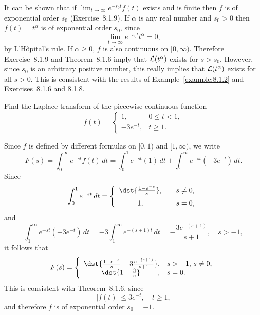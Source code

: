\setcounter{example}{8}
\begin{example}
  \label{example:8.1.9}\rm It can be shown that if $\lim_{t\to\infty}e^{-s_{0}t}f(t)$ exists and is
  finite then $f$ is of exponential order $s_{0}$ (Exercise~8.1.9). If $\alpha$ is any
  real number and $s_{0}>0$ then $f(t)=t^{\alpha}$ is of exponential order $s_{0}$, since
  \[
    \lim_{t\to\infty}e^{-s_{0}t}t^{\alpha}=0,
  \]
  by L'H\^opital's rule. If $\alpha\ge0$, $f$ is also continuous on $[0,\infty)$. Therefore
  Exercise~8.1.9 and Theorem~8.1.6 imply that ${\cal L}(t^{\alpha})$ exists
  for $s> s_{0}$. However, since $s_{0}$ is an arbitrary positive number, this really implies that
  ${\cal L}(t^{\alpha})$ exists for all $s>0$. This is consistent with the results of
  Example~\ref{example:8.1.2} and Exercises~8.1.6 and 8.1.8.
\end{example}

\setcounter{example}{9}
\begin{example}
  \label{example:8.1.10}\rm Find the Laplace transform of the piecewise continuous function
  \[
    f(t)=\left\{
    \begin{array}{cl}
      1,        & 0\le t<1, \\
      -3e^{-t}, & t\ge 1.
    \end{array}\right.
  \]
\end{example}
\begin{examplesolution}
\solution Since $f$ is defined by different formulas on $[0,1)$ and $[1,\infty)$, we write
\[
  F(s)=\int_{0}^{\infty}e^{-st}f(t)\,dt =\int_{0}^{1}e^{-st}(1)\,dt+\int_{1}^{\infty}e^{-st}(-3e^{-t})\,dt.
\]
Since
\[
  \int_{0}^{1}e^{-st}\,dt=\left\{
  \begin{array}{cl}
    \dst{\frac{1-e^{-s}}{s}}, & \quad s\ne0, \\[2\jot]
    1,                        & \quad s=0,
  \end{array}\right.
\]
and
\[
  \int_{1}^{\infty}e^{-st}(-3e^{-t})\,dt=-3\int_{1}^{\infty}e^{-(s+1)t}\,dt=-\frac{3e^{-(s+1)}}{s+1},\quad s>-1,
\]
it follows that
\[
  F(s)=\left\{
  \begin{array}{rl}
    \dst{\frac{1-e^{-s}}{s}-3{\frac{e^{-(s+1)}}{s+1}}}, & s>-1,\,s\ne0, \\
    \hfill\dst{1-\frac{3}{e}}\hfill,                    & s=0.
  \end{array}\right.
\]
This is consistent with Theorem~8.1.6, since
\[
  |f(t)|\le3e^{-t},\quad t\ge1,
\]
and therefore $f$ is of exponential order $s_{0}=-1$.
\end{examplesolution}

